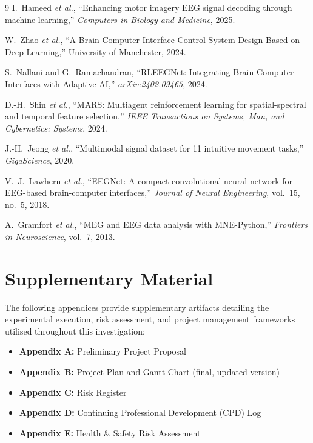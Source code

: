 \documentclass[12pt, a4paper]{article}
\begin{document}
\begin{thebibliography}{9}
I.~Hameed \emph{et al.}, ``Enhancing motor imagery EEG signal decoding through machine learning,'' \textit{Computers in Biology and Medicine}, 2025.

W.~Zhao \emph{et al.}, ``A Brain-Computer Interface Control System Design Based on Deep Learning,'' University of Manchester, 2024.

S.~Nallani and G.~Ramachandran, ``RLEEGNet: Integrating Brain-Computer Interfaces with Adaptive AI,'' \textit{arXiv:2402.09465}, 2024.

D.-H.~Shin \emph{et al.}, ``MARS: Multiagent reinforcement learning for spatial-spectral and temporal feature selection,'' \textit{IEEE Transactions on Systems, Man, and Cybernetics: Systems}, 2024.

J.-H.~Jeong \emph{et al.}, ``Multimodal signal dataset for 11 intuitive movement tasks,'' \textit{GigaScience}, 2020.

V.~J.~Lawhern \emph{et al.}, ``EEGNet: A compact convolutional neural network for EEG-based brain-computer interfaces,'' \textit{Journal of Neural Engineering}, vol.~15, no.~5, 2018.

A.~Gramfort \emph{et al.}, ``MEG and EEG data analysis with MNE-Python,'' \textit{Frontiers in Neuroscience}, vol.~7, 2013.
\end{thebibliography}

\newpage
\section*{Supplementary Material}

The following appendices provide supplementary artifacts detailing the experimental execution, risk assessment, and project management frameworks utilised throughout this investigation:

\begin{itemize}
    \item \textbf{Appendix A:} Preliminary Project Proposal
    \item \textbf{Appendix B:} Project Plan and Gantt Chart (final, updated version)
    \item \textbf{Appendix C:} Risk Register
    \item \textbf{Appendix D:} Continuing Professional Development (CPD) Log
    \item \textbf{Appendix E:} Health \& Safety Risk Assessment
\end{itemize}
\end{document}
